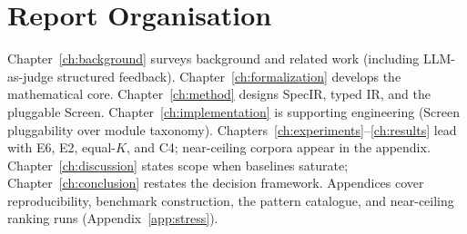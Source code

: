 \section{Report Organisation}
\label{sec:intro:organisation}

Chapter~\ref{ch:background} surveys background and related work (including
LLM-as-judge structured feedback).
Chapter~\ref{ch:formalization} develops the mathematical core.
Chapter~\ref{ch:method} designs SpecIR, typed IR, and the pluggable Screen.
Chapter~\ref{ch:implementation} is supporting engineering (Screen
pluggability over module taxonomy).
Chapters~\ref{ch:experiments}--\ref{ch:results} lead with E6, E2, equal-$K$,
and C4; near-ceiling corpora appear in the appendix.
Chapter~\ref{ch:discussion} states scope when baselines saturate;
Chapter~\ref{ch:conclusion} restates the decision framework.
Appendices cover reproducibility, benchmark construction, the pattern
catalogue, and near-ceiling ranking runs (Appendix~\ref{app:stress}).
